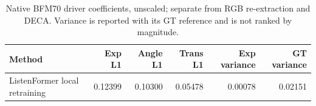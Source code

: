 \begin{table}[t]
\centering\small
\caption{Native BFM70 driver coefficients, unscaled; separate from RGB re-extraction and DECA. Variance is reported with its GT reference and is not ranked by magnitude.}
\label{tab:vico-more-native}
\setlength{\tabcolsep}{4pt}
\begin{tabular}{lrrrrr}
\toprule
Method & Exp L1 & Angle L1 & Trans L1 & Exp variance & GT variance \\
\midrule
ListenFormer local retraining & 0.12399 & 0.10300 & 0.05478 & 0.00078 & 0.02151 \\
\bottomrule
\end{tabular}
\end{table}
